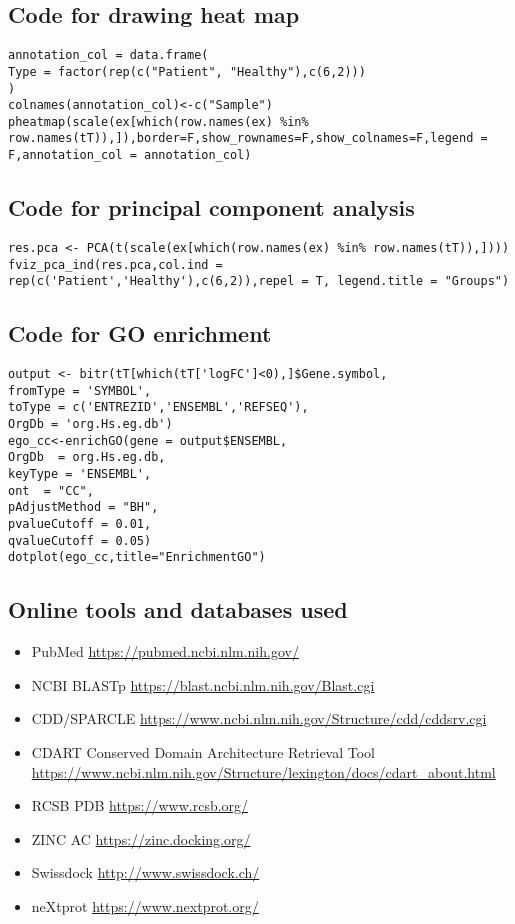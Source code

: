 \subsection*{Code for drawing heat map}
\begin{lstlisting}
annotation_col = data.frame(
Type = factor(rep(c("Patient", "Healthy"),c(6,2)))
)
colnames(annotation_col)<-c("Sample")
pheatmap(scale(ex[which(row.names(ex) %in% row.names(tT)),]),border=F,show_rownames=F,show_colnames=F,legend = F,annotation_col = annotation_col)
\end{lstlisting}
\subsection*{Code for principal component analysis}
\begin{lstlisting}
res.pca <- PCA(t(scale(ex[which(row.names(ex) %in% row.names(tT)),])))
fviz_pca_ind(res.pca,col.ind = rep(c('Patient','Healthy'),c(6,2)),repel = T, legend.title = "Groups")
\end{lstlisting}

\subsection*{Code for GO enrichment}
\begin{lstlisting}
output <- bitr(tT[which(tT['logFC']<0),]$Gene.symbol,
fromType = 'SYMBOL',
toType = c('ENTREZID','ENSEMBL','REFSEQ'),
OrgDb = 'org.Hs.eg.db')
ego_cc<-enrichGO(gene = output$ENSEMBL,
OrgDb  = org.Hs.eg.db,
keyType = 'ENSEMBL',
ont  = "CC",
pAdjustMethod = "BH",
pvalueCutoff = 0.01,
qvalueCutoff = 0.05)
dotplot(ego_cc,title="EnrichmentGO")
\end{lstlisting}

\subsection*{Online tools and databases used}
\begin{itemize}
    \item PubMed \url{https://pubmed.ncbi.nlm.nih.gov/}
    \item NCBI BLASTp \url{https://blast.ncbi.nlm.nih.gov/Blast.cgi}
    \item CDD/SPARCLE \url{https://www.ncbi.nlm.nih.gov/Structure/cdd/cddsrv.cgi}
    \item CDART Conserved Domain Architecture Retrieval Tool \url{https://www.ncbi.nlm.nih.gov/Structure/lexington/docs/cdart_about.html}
    \item RCSB PDB \url{https://www.rcsb.org/}
    \item ZINC AC \url{https://zinc.docking.org/}
    \item Swissdock \url{http://www.swissdock.ch/}
    \item neXtprot \url{https://www.nextprot.org/}
\end{itemize}